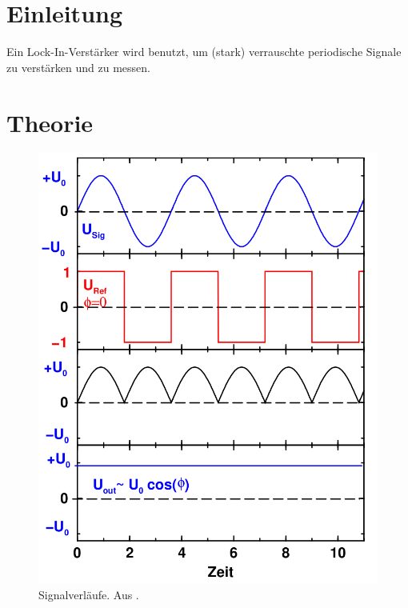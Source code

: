 \section{Einleitung}
Ein Lock-In-Verstärker wird benutzt, um (stark) verrauschte periodische Signale zu verstärken und zu messen.

\section{Theorie}
\label{sec:Theorie}

\begin{figure}
  \centering
  \includegraphics[width=.5\textwidth]{content/grafiken/Wellen.png}
  \caption{Signalverläufe. Aus \cite{anleitung303}.}
  \label{fig:wellen}
\end{figure}

